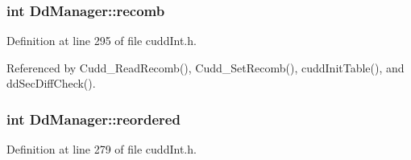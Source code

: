 \subsubsection{\setlength{\rightskip}{0pt plus 5cm}int \bf{Dd\-Manager::recomb}}\label{structDdManager_38b89daefdc8aab944fbc2ff2aece2f4}




Definition at line 295 of file cudd\-Int.h.

Referenced by Cudd\_\-Read\-Recomb(), Cudd\_\-Set\-Recomb(), cudd\-Init\-Table(), and dd\-Sec\-Diff\-Check().
\subsubsection{\setlength{\rightskip}{0pt plus 5cm}int \bf{Dd\-Manager::reordered}}\label{structDdManager_b8c81b5f0658b90c2c3bd339123a1f7a}




Definition at line 279 of file cudd\-Int.h.


